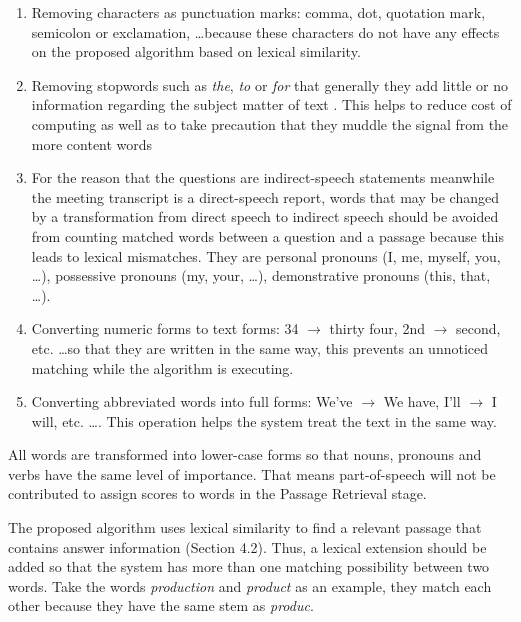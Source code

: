 \begin{enumerate}
\item {Removing characters as punctuation marks: comma, dot, quotation mark, semicolon or exclamation, \ldots because these characters do not have any effects on the proposed algorithm based on lexical similarity. } 

\item {Removing stopwords such as \textit{the}, \textit{to} or \textit{for} that generally they add little or no information regarding the subject matter of text \cite{mckechnie2001cap}.  This helps to reduce cost of computing as well as to take precaution that they muddle the signal from the more content words \cite{hirschman1999drr}}

\item {For the reason that the questions are indirect-speech statements meanwhile the meeting transcript is a direct-speech report, words that may be changed by a transformation from direct speech to indirect speech should be avoided from counting matched words between a question and a passage because this leads to lexical mismatches. They are personal pronouns (I, me, myself, you, \ldots), possessive pronouns (my, your, \ldots), demonstrative pronouns (this, that, \ldots).}



\item {Converting numeric forms to text forms: 34 \ensuremath{\rightarrow} thirty four, 2nd \ensuremath{\rightarrow} second, etc. \ldots so that they are written in the same way, this prevents an unnoticed matching while the algorithm is executing. }

\item {Converting abbreviated words into full forms: We've \ensuremath{\rightarrow} We have, I'll \ensuremath{\rightarrow} I will, etc. \ldots. This operation helps the system treat the text in the same way.}
\end{enumerate}

All words are transformed into lower-case forms so that nouns, pronouns and verbs have the same level of importance. That means part-of-speech will not be contributed to assign scores to words in the Passage Retrieval stage.

The proposed algorithm uses lexical similarity to find a relevant passage that contains answer information (Section 4.2). Thus, a lexical extension should be added so that the system has more than one matching possibility between two words. Take the words \textit{production} and \textit{product} as an example, they match each other because they have the same stem as \textit{produc}.

